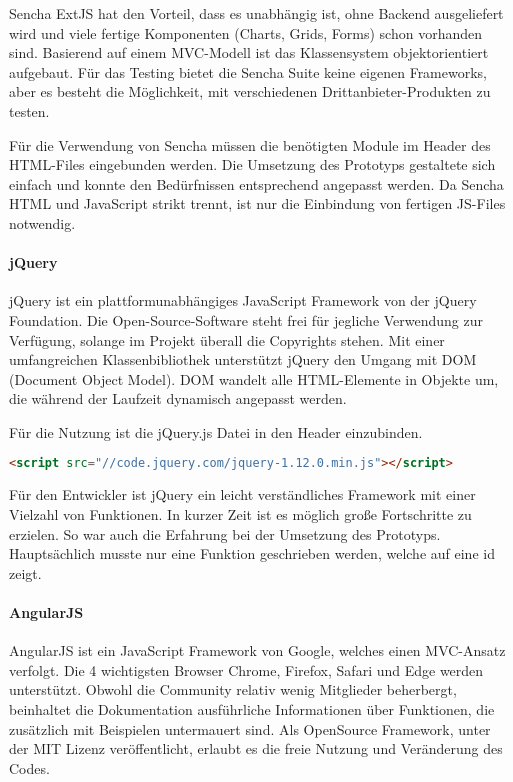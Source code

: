 Sencha ExtJS hat den Vorteil, dass es unabhängig ist, ohne Backend ausgeliefert wird und viele fertige Komponenten (Charts, Grids, Forms) schon vorhanden sind. Basierend auf einem MVC-Modell ist das Klassensystem objektorientiert aufgebaut. Für das Testing bietet die Sencha Suite keine eigenen Frameworks, aber es besteht die Möglichkeit, mit verschiedenen Drittanbieter-Produkten zu testen.\cite{SENCHAFEATURES}\cite{SENCHALICENSE}

Für die Verwendung von Sencha müssen die benötigten Module im Header des HTML-Files eingebunden werden. Die Umsetzung des Prototyps gestaltete sich einfach und konnte den Bedürfnissen entsprechend angepasst werden. Da Sencha HTML und JavaScript strikt trennt, ist nur die Einbindung von fertigen JS-Files notwendig.

\paragraph{jQuery}
jQuery ist ein plattformunabhängiges JavaScript Framework von der jQuery Foundation. Die Open-Source-Software steht frei für jegliche Verwendung zur Verfügung, solange im Projekt überall die Copyrights stehen. Mit einer umfangreichen Klassenbibliothek unterstützt jQuery den Umgang mit DOM (Document Object Model). DOM wandelt alle HTML-Elemente in Objekte um, die während der Laufzeit dynamisch angepasst werden.\cite{JQUERY} 

Für die Nutzung ist die jQuery.js Datei in den Header einzubinden.
\begin{lstlisting}[caption={jQuery einbinden\cite{JQUERYDOWN}}, language=HTML]
<script src="//code.jquery.com/jquery-1.12.0.min.js"></script>
\end{lstlisting}

Für den Entwickler ist jQuery ein leicht verständliches Framework mit einer Vielzahl von Funktionen. In kurzer Zeit ist es möglich große Fortschritte zu erzielen. So war auch die Erfahrung bei der Umsetzung des Prototyps. Hauptsächlich musste nur eine Funktion geschrieben werden, welche auf eine id zeigt. \cite{JQUERYTOOL}

\paragraph{AngularJS}
AngularJS ist ein JavaScript Framework von Google, welches einen MVC-Ansatz verfolgt. Die 4 wichtigsten Browser Chrome, Firefox, Safari und Edge werden unterstützt. Obwohl die Community relativ wenig Mitglieder beherbergt, beinhaltet die Dokumentation ausführliche Informationen über Funktionen, die zusätzlich mit Beispielen untermauert sind. Als OpenSource Framework, unter der MIT Lizenz veröffentlicht, erlaubt es die freie Nutzung und Veränderung des Codes.


